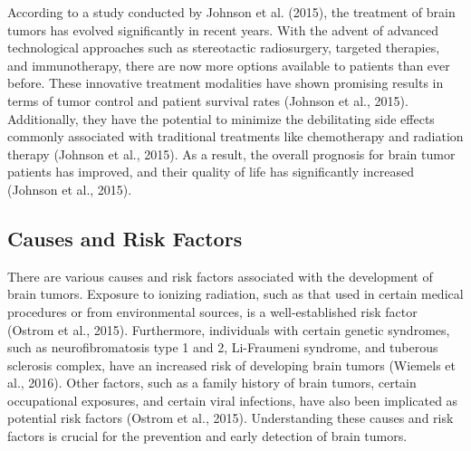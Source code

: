 \documentclass[12pt,oneside]{report}
\begin{document}
\begin{enumerate}
\begin{enumerate}
According to a study conducted by Johnson et al. (2015), the treatment of brain tumors has evolved significantly in recent years. With the advent of advanced technological approaches such as stereotactic radiosurgery, targeted therapies, and immunotherapy, there are now more options available to patients than ever before. These innovative treatment modalities have shown promising results in terms of tumor control and patient survival rates (Johnson et al., 2015). Additionally, they have the potential to minimize the debilitating side effects commonly associated with traditional treatments like chemotherapy and radiation therapy (Johnson et al., 2015). As a result, the overall prognosis for brain tumor patients has improved, and their quality of life has significantly increased (Johnson et al., 2015).

\end{enumerate}

\end{enumerate}

\subsection{Causes and Risk Factors}
There are various causes and risk factors associated with the development of brain tumors. Exposure to ionizing radiation, such as that used in certain medical procedures or from environmental sources, is a well-established risk factor (Ostrom et al., 2015). Furthermore, individuals with certain genetic syndromes, such as neurofibromatosis type 1 and 2, Li-Fraumeni syndrome, and tuberous sclerosis complex, have an increased risk of developing brain tumors (Wiemels et al., 2016). Other factors, such as a family history of brain tumors, certain occupational exposures, and certain viral infections, have also been implicated as potential risk factors (Ostrom et al., 2015). Understanding these causes and risk factors is crucial for the prevention and early detection of brain tumors.
\end{document}
